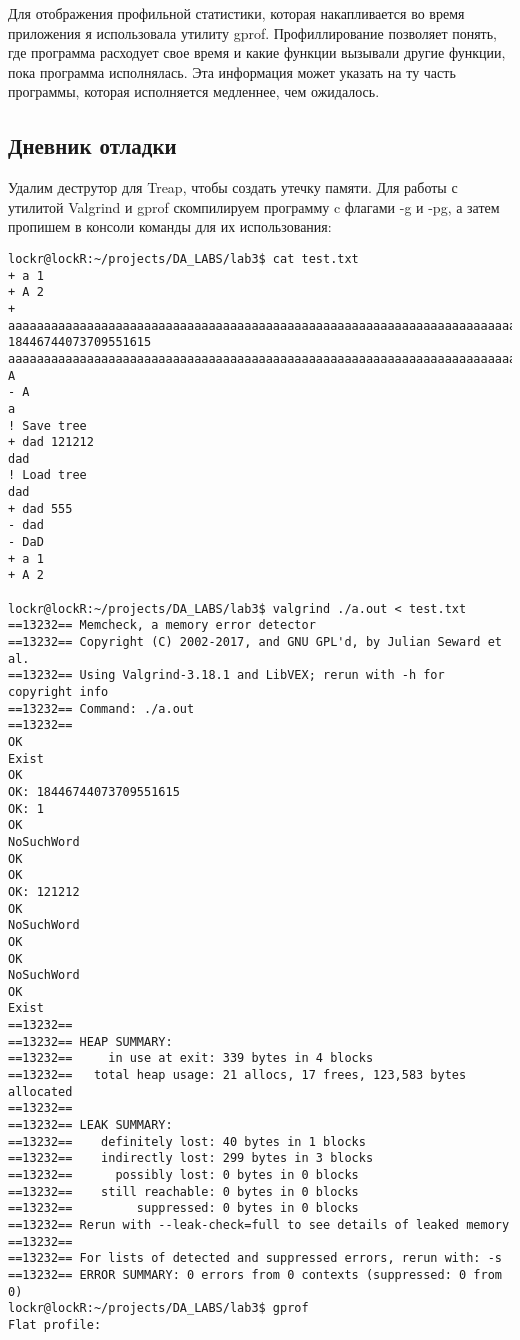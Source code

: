 \documentclass[12pt]{article}
\begin{document}
Для отображения профильной статистики, которая накапливается во время приложения я использовала утилиту gprof. Профиллирование позволяет понять, где программа расходует свое время и какие функции вызывали другие функции, пока программа
исполнялась. Эта информация может указать на ту часть программы, которая исполняется медленнее, чем ожидалось.


\subsection*{Дневник отладки}
Удалим деструтор для Treap, чтобы создать утечку памяти.
Для работы с утилитой Valgrind и gprof скомпилируем программу c флагами -g и -pg, а затем пропишем в консоли команды для их использования:
\begin{lstlisting}[breaklines]
    lockr@lockR:~/projects/DA_LABS/lab3$ cat test.txt
+ a 1
+ A 2
+ aaaaaaaaaaaaaaaaaaaaaaaaaaaaaaaaaaaaaaaaaaaaaaaaaaaaaaaaaaaaaaaaaaaaaaaaaaaaaaaaaaaaaaaaaaaaaaaaaaaaaaaaaaaaaaaaaaaaaaaaaaaaaaaaaaaaaaaaaaaaaaaaaaaaaaaaaaaaaaaaaaaaaaaaaaaaaaaaaaaaaaaaaaaaaaaaaaaaaaaaaaaaaaaaaaaaaaaaaaaaaaaaaaaaaaaaaaaaaaaaaaaaaaaaaaaaaaaa 18446744073709551615
aaaaaaaaaaaaaaaaaaaaaaaaaaaaaaaaaaaaaaaaaaaaaaaaaaaaaaaaaaaaaaaaaaaaaaaaaaaaaaaaaaaaaaaaaaaaaaaaaaaaaaaaaaaaaaaaaaaaaaaaaaaaaaaaaaaaaaaaaaaaaaaaaaaaaaaaaaaaaaaaaaaaaaaaaaaaaaaaaaaaaaaaaaaaaaaaaaaaaaaaaaaaaaaaaaaaaaaaaaaaaaaaaaaaaaaaaaaaaaaaaaaaaaaaaaaaaaaa
A
- A
a
! Save tree
+ dad 121212
dad
! Load tree
dad
+ dad 555
- dad
- DaD 
+ a 1
+ A 2

lockr@lockR:~/projects/DA_LABS/lab3$ valgrind ./a.out < test.txt
==13232== Memcheck, a memory error detector
==13232== Copyright (C) 2002-2017, and GNU GPL'd, by Julian Seward et al.
==13232== Using Valgrind-3.18.1 and LibVEX; rerun with -h for copyright info
==13232== Command: ./a.out
==13232== 
OK
Exist
OK
OK: 18446744073709551615
OK: 1
OK
NoSuchWord
OK
OK
OK: 121212
OK
NoSuchWord
OK
OK
NoSuchWord
OK
Exist
==13232== 
==13232== HEAP SUMMARY:
==13232==     in use at exit: 339 bytes in 4 blocks
==13232==   total heap usage: 21 allocs, 17 frees, 123,583 bytes allocated
==13232== 
==13232== LEAK SUMMARY:
==13232==    definitely lost: 40 bytes in 1 blocks
==13232==    indirectly lost: 299 bytes in 3 blocks
==13232==      possibly lost: 0 bytes in 0 blocks
==13232==    still reachable: 0 bytes in 0 blocks
==13232==         suppressed: 0 bytes in 0 blocks
==13232== Rerun with --leak-check=full to see details of leaked memory
==13232== 
==13232== For lists of detected and suppressed errors, rerun with: -s
==13232== ERROR SUMMARY: 0 errors from 0 contexts (suppressed: 0 from 0)
lockr@lockR:~/projects/DA_LABS/lab3$ gprof
Flat profile:


\end{lstlisting}
\end{document}
